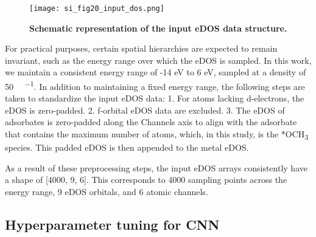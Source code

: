 \begin{figure}
  \centering
  \texttt{[image: si\_fig20\_input\_dos.png]}
  \caption{\textbf{Schematic representation of the input eDOS data structure.}}
  \label{si_fig20:input_dos}
\end{figure}

For practical purposes, certain spatial hierarchies are expected to remain invariant,
such as the energy range over which the eDOS is sampled.
In this work, we maintain a consistent energy range of -14 eV to 6 eV,
sampled at a density of 50 \si{ \cdot {}^{-1}}.
In addition to maintaining a fixed energy range,
the following steps are taken to standardize the input eDOS data:
  1.	For atoms lacking d-electrons, the eDOS is zero-padded.
  2.	f-orbital eDOS data are excluded.
  3.	The eDOS of adsorbates is zero-padded along the Channels axis to align with the adsorbate that contains the maximum number of atoms, which, in this study, is the *OCH\textsubscript{3} species. This padded eDOS is then appended to the metal eDOS.

As a result of these preprocessing steps, the input eDOS arrays consistently have a shape of [4000, 9, 6].
This corresponds to 4000 sampling points across the energy range, 9 eDOS orbitals, and 6 atomic channels.

\subsection{Hyperparameter tuning for CNN}
\label{si_sec3.4_hyperparam}

